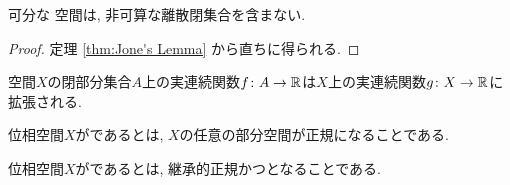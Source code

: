 \documentclass[uplatex, dvipdfmx, a4paper, 12pt, class=jsbook, crop=false]{standalone}
\begin{document}
\begin{corollary}
	\label{coro:Corollary of Jone's Lamma}
	可分な  空間は, 非可算な離散閉集合を含まない.
\end{corollary}

\begin{proof}
	定理 \ref{thm:Jone's Lemma} から直ちに得られる.
\end{proof}

\begin{theorem}[\Tietze]
	\label{thm:Tietze's extension theorem}
	 空間$ X $の閉部分集合$ A $上の実連続関数$ f \colon A \to \mathbb{R} $は$ X $上の実連続関数$ g \colon X \to \mathbb{R} $に拡張される.
\end{theorem}

\begin{definition}
	位相空間$ X $がであるとは, $ X $の任意の部分空間が正規になることである.
\end{definition}

\begin{definition}
	位相空間$ X $がであるとは, 継承的正規かつとなることである.
\end{definition}
\end{document}
